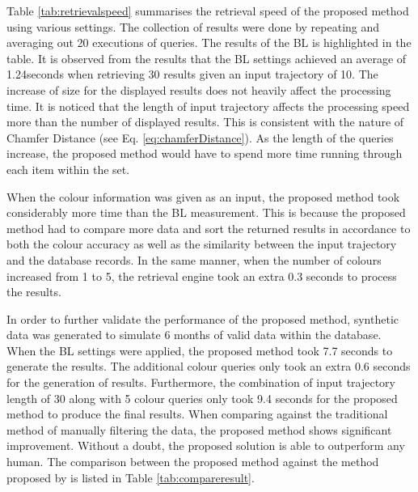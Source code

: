 Table \ref{tab:retrievalspeed} summarises the retrieval speed of the proposed method using various settings.
The collection of results were done by repeating and averaging out 20 executions of queries.
The results of the BL is highlighted in the table.
It is observed from the results that the BL settings achieved an average of 1.24seconds when retrieving 30 results given an input trajectory of 10. The increase of size for the displayed results does not heavily affect the processing time. It is noticed that the length of input trajectory affects the processing speed more than the number of displayed results. This is consistent with the nature of Chamfer Distance (see Eq. \ref{eq:chamferDistance}). As the length of the queries increase, the proposed method would have to spend more time running through each item within the set.

When the colour information was given as an input, the proposed method took considerably more time than the BL measurement. This is because the proposed method had to compare more data and sort the returned results in accordance to both the colour accuracy as well as the similarity between the input trajectory and the database records. In the same manner, when the number of colours increased from 1 to 5, the retrieval engine took an extra 0.3 seconds to process the results.

In order to further validate the performance of the proposed method, synthetic data was generated to simulate 6 months of valid data within the database. When the BL settings were applied, the proposed method took 7.7 seconds to generate the results. The additional colour queries only took an extra 0.6 seconds for the generation of results. Furthermore, the combination of input trajectory length of 30 along with 5 colour queries only took 9.4 seconds for the proposed method to produce the final results.
When comparing against the traditional method of manually filtering the data, the proposed method shows significant improvement. Without a doubt, the proposed solution is able to outperform any human. The comparison between the proposed method against the method proposed by  is listed in Table \ref{tab:compareresult}.






